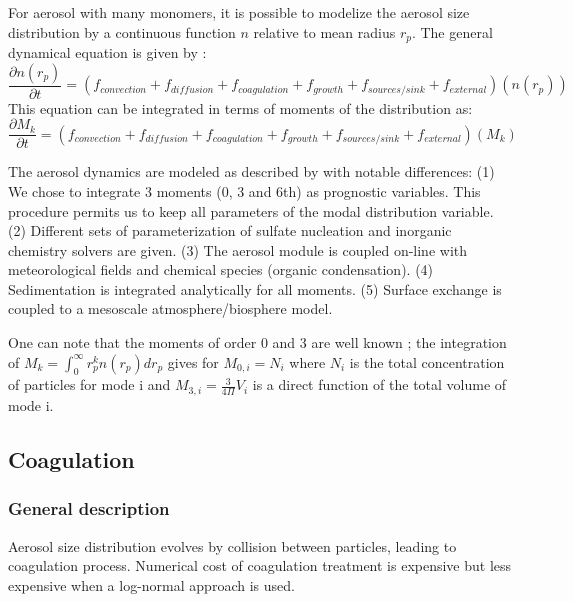 For aerosol with many monomers, it is possible to modelize the aerosol size 
distribution by 
a continuous function $n$ relative to mean radius $r_p$. The general dynamical 
equation is given by \citet{Friedlander1977}:
\begin{equation}
\frac{\partial n(r_p)}{\partial t} = (f_{convection} + f_{diffusion} + 
f_{coagulation} +
f_{growth} + f_{sources/sink} + f_{external})(n(r_p))
\label{GDE}
\end{equation}
This equation can be integrated in terms of moments of the distribution as:
\begin{equation}
\frac{\partial M_k}{\partial t} = (f_{convection} + f_{diffusion} + 
f_{coagulation} +
f_{growth} + f_{sources/sink} + f_{external})(M_k)
\label{GDE_M}
\end{equation}

The aerosol dynamics are modeled  as described by
\citet{Whitby1991,Binkowski1995,Ackermann1998,Binkowski2003} 
with notable differences: (1) We chose to integrate 3 moments (0, 3 and 6th) as 
prognostic variables. This
procedure permits us to keep all parameters of the modal distribution variable.
(2) Different sets of parameterization of sulfate nucleation and inorganic 
chemistry solvers are given.
(3) The aerosol module is coupled on-line with meteorological fields and chemical 
species (organic condensation).
(4) Sedimentation is integrated analytically for all moments.
(5) Surface exchange is coupled to a mesoscale 
atmosphere/biosphere model.

One can note that the moments of order 0 and 3 are well known ; the integration 
of $M_k = \int_{0}^{\infty} r_{p}^{k} n(r_p) dr_p$ gives for $M_{0,i}=N_i$ where 
$N_i$ is the total concentration of particles for mode i and $M_{3,i}= 
\frac{3}{4 \Pi} V_i$  is a direct function of the total volume of mode i.

\subsection{Coagulation}
\subsubsection*{General description}
Aerosol size distribution evolves by collision between particles, leading to 
coagulation process. Numerical cost of coagulation treatment is expensive but less expensive when
a log-normal approach is used. 

